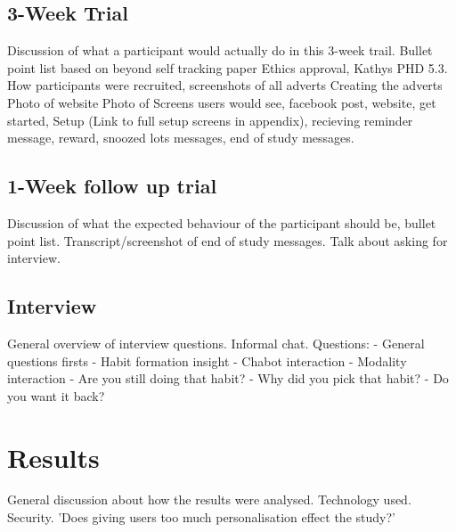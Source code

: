 \subsection{3-Week Trial}

Discussion of what a participant would actually do in this 3-week trail.\newline
Bullet point list based on beyond self tracking paper\newline
Ethics approval, Kathys PHD 5.3.\newline
How participants were recruited, screenshots of all adverts\newline
Creating the adverts\newline
Photo of website\newline
Photo of Screens users would see, facebook post, website, get started, Setup (Link to full setup screens in appendix), recieving reminder message, reward, snoozed lots messages, end of study messages.\newline

\subsection{1-Week follow up trial}

Discussion of what the expected behaviour of the participant should be, bullet point list.\newline
Transcript/screenshot of end of study messages.\newline
Talk about asking for interview.

\subsection{Interview}

General overview of interview questions.\newline
Informal chat.\newline
Questions:
  - General questions firsts
  - Habit formation insight
  - Chabot interaction
  - Modality interaction
  - Are you still doing that habit?
  - Why did you pick that habit?
  - Do you want it back?


\section{Results}

General discussion about how the results were analysed. Technology used. Security.\newline
'Does giving users too much personalisation effect the study?'\newline



